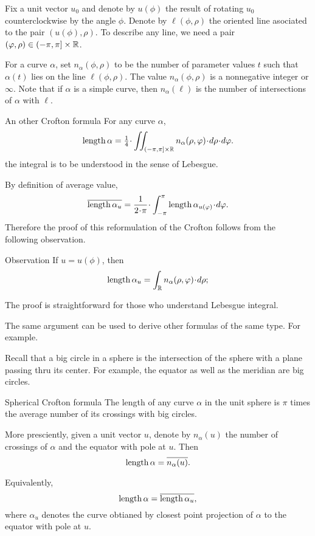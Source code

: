 Fix a unit vector $u_0$ and denote by $u(\phi)$ the result of rotating $u_0$ counterclockwise by the angle $\phi $.%
Denote by $\ell(\phi,\rho)$ the oriented line asociated to the pair $(u(\phi),\rho)$.
To describe any line, we need a pair $(\varphi,\rho)\in (-\pi,\pi]\times \mathbb{R}$.

For a curve $\alpha$, set $n_\alpha(\phi,\rho)$ to be the number of parameter values $t$ such that $\alpha(t)$ lies on the line $\ell(\phi,\rho)$. 
The value $n_\alpha(\phi,\rho)$ is a nonnegative integer or $\infty$.
Note that if $\alpha$ is a simple curve, then $n_\alpha(\ell)$ is the number of intersections of $\alpha$ with $\ell$.


\begin{thm}{An other Crofton formula}
For any curve $\alpha$,
\[\length\alpha=\tfrac14\cdot\iint_{(-\pi,\pi]\times \RR} n_\alpha(\rho,\phi)\cdot d\rho\cdot d\phi.\]
the integral is to be understood in the sense of Lebesgue.
\end{thm}

By definition of average value,
\[\overline{\length\alpha_u}
=
\frac1{2\cdot\pi}\cdot\int_{-\pi}^\pi \length\alpha_{u(\phi)}\cdot d\phi.\]
Therefore the proof of this reformulation of the Crofton follows from the following observation.

\begin{thm}{Observation}
If $u=u(\phi)$, then 
\[\length\alpha_u=\int_\RR n_\alpha(\rho,\phi)\cdot d\rho;\]

\end{thm}

The proof is straightforward for those who understand Lebesgue integral.

The same argument can be used to derive other formulas of the same type.
For example.

Recall that a big circle in a sphere is the intersection of the sphere with a plane passing thru its center.
For example, the equator as well as the meridian are big circles.

\begin{thm}{Spherical Crofton formula}
The length of any curve $\alpha$ in the unit sphere is $\pi$ times the average number of its crossings with big circles.

More presciently, given a unit vector $u$, denote by $n_\alpha(u)$ the number of crossings of $\alpha$ and the equator with pole at $u$.
Then 
\[\mathop{\rm length}\nolimits\alpha=\overline{n_\alpha(u)}.\]

Equivalently,
\[\mathop{\rm length}\nolimits\alpha=\overline{\mathop{\rm length}\nolimits\alpha_u},\]
where $\alpha_u$ denotes the curve obtianed by closest point projection of $\alpha$ to the equator with pole at $u$.
\end{thm}


